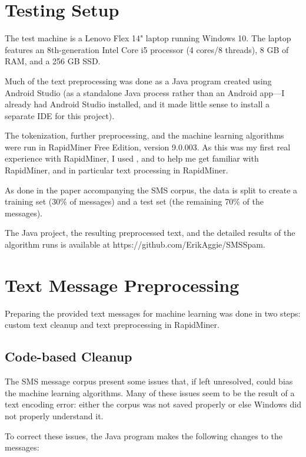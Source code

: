 \documentclass[10pt,journal,compsoc]{IEEEtran}
\begin{document}
\section{Testing Setup}

The test machine is a Lenovo Flex 14" laptop running Windows 10. The laptop features an 8th-generation Intel Core i5 processor (4 cores/8 threads), 8 GB of RAM, and a 256 GB SSD.

Much of the text preprocessing was done as a Java program created using Android Studio (as a standalone Java process rather than an Android app---I already had Android Studio installed, and it made little sense to install a separate IDE for this project).

The tokenization, further preprocessing, and the machine learning algorithms were run in RapidMiner Free Edition, version 9.0.003. As this was my first real experience with RapidMiner, I used \cite{Site Ref 1} \cite{Site Ref 2} \cite{Site Ref 3}, and \cite{Site Ref 4} to help me get familiar with RapidMiner, and in particular text processing in RapidMiner.

As done in the paper accompanying the SMS corpus, the data is split to create a training set (30\% of messages) and a test set (the remaining 70\% of the messages). \cite{Paper}

The Java project, the resulting preprocessed text, and the detailed results of the algorithm runs is available at https://github.com/ErikAggie/SMSSpam.

\section{Text Message Preprocessing}

Preparing the provided text messages for machine learning was done in two steps: custom text cleanup and text preprocessing in RapidMiner.

\subsection{Code-based Cleanup}

The SMS message corpus \cite{SMS Collection} present some issues that, if left unresolved, could bias the machine learning algorithms. Many of these issues seem to be the result of a text encoding error: either the corpus was not saved properly or else Windows did not properly understand it.

To correct these issues, the Java program makes the following changes to the messages:
\end{document}
